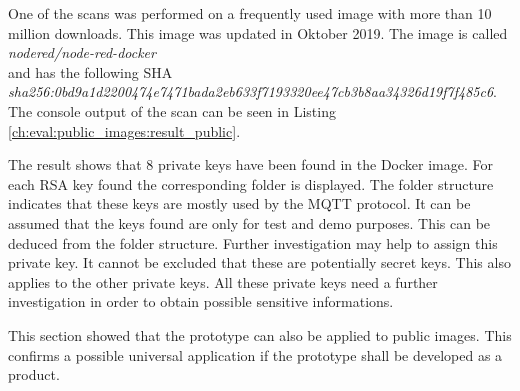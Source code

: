 One of the scans was performed on a frequently used image with more than 10 million downloads.
This image was updated in Oktober 2019. 
The image is called \textit{nodered/node-red-docker} \\and has the following SHA \\\textit{sha256:0bd9a1d2200474e7471bada2eb633f7193320ee47cb3b8aa34326d19f7f485c6}.
\\The console output of the scan can be seen in Listing \ref{ch:eval:public_images:result_public}.

The result shows that 8 private keys have been found in the Docker image.
For each RSA key found the corresponding folder is displayed.
The folder structure indicates that these keys are mostly used by the MQTT protocol.
It can be assumed that the keys found are only for test and demo purposes. This can be deduced from the folder structure.
Further investigation may help to assign this private key. 
It cannot be excluded that these are potentially secret keys.
This also applies to the other private keys.
All these private keys need a further investigation in order to obtain possible sensitive informations.

This section showed that the prototype can also be applied to public images.
This confirms a possible universal application if the prototype shall be developed as a product. 
